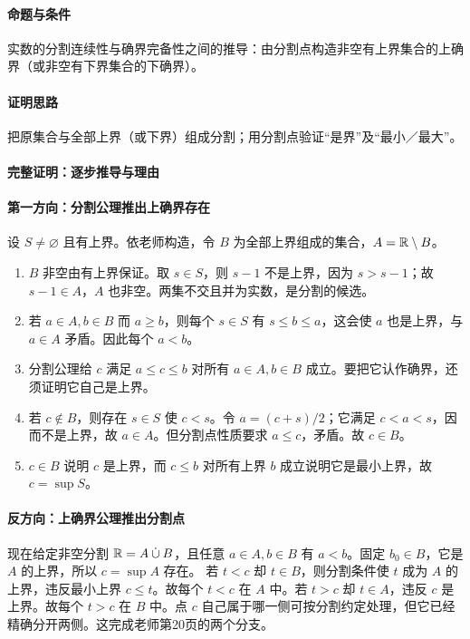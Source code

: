 \paragraph{命题与条件}实数的分割连续性与确界完备性之间的推导：由分割点构造非空有上界集合的上确界（或非空有下界集合的下确界）。
\paragraph{证明思路}把原集合与全部上界（或下界）组成分割；用分割点验证“是界”及“最小／最大”。
\paragraph{完整证明：逐步推导与理由}

\paragraph{第一方向：分割公理推出上确界存在}
设 $S\ne\varnothing$ 且有上界。依老师构造，令 $B$ 为全部上界组成的集合，$A=\mathbb{R}\setminus B$。
\begin{enumerate}
\item $B$ 非空由有上界保证。取 $s\in S$，则 $s-1$ 不是上界，因为 $s>s-1$；故 $s-1\in A$，$A$ 也非空。两集不交且并为实数，是分割的候选。
\item 若 $a\in A,b\in B$ 而 $a\ge b$，则每个 $s\in S$ 有 $s\le b\le a$，这会使 $a$ 也是上界，与 $a\in A$ 矛盾。因此每个 $a<b$。
\item 分割公理给 $c$ 满足 $a\le c\le b$ 对所有 $a\in A,b\in B$ 成立。要把它认作确界，还须证明它自己是上界。
\item 若 $c\notin B$，则存在 $s\in S$ 使 $c<s$。令 $a=(c+s)/2$；它满足 $c<a<s$，因而不是上界，故 $a\in A$。但分割点性质要求 $a\le c$，矛盾。故 $c\in B$。
\item $c\in B$ 说明 $c$ 是上界，而 $c\le b$ 对所有上界 $b$ 成立说明它是最小上界，故 $c=\sup S$。
\end{enumerate}
\paragraph{反方向：上确界公理推出分割点}
现在给定非空分割 $\mathbb{R}=A\mathbin{\dot\cup}B$，且任意 $a\in A,b\in B$ 有 $a<b$。固定 $b_0\in B$，它是 $A$ 的上界，所以 $c=\sup A$ 存在。
若 $t<c$ 却 $t\in B$，则分割条件使 $t$ 成为 $A$ 的上界，违反最小上界 $c\le t$。故每个 $t<c$ 在 $A$ 中。若 $t>c$ 却 $t\in A$，违反 $c$ 是上界。故每个 $t>c$ 在 $B$ 中。点 $c$ 自己属于哪一侧可按分割约定处理，但它已经精确分开两侧。这完成老师第20页的两个分支。


